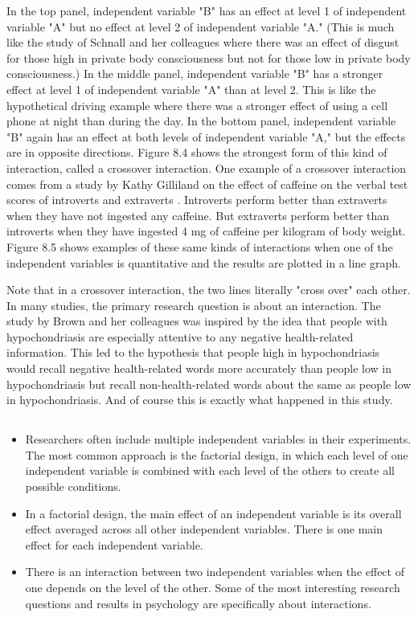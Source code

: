 In the top panel, independent variable "B" has an effect at level 1 of independent variable "A" but no effect at level 2 of independent variable "A." (This is much like the study of Schnall and her colleagues where there was an effect of disgust for those high in private body consciousness but not for those low in private body consciousness.) In the middle panel, independent variable "B" has a stronger effect at level 1 of independent variable "A" than at level 2. This is like the hypothetical driving example where there was a stronger effect of using a cell phone at night than during the day. In the bottom panel, independent variable "B" again has an effect at both levels of independent variable "A," but the effects are in opposite directions. Figure 8.4 shows the strongest form of this kind of interaction, called a crossover interaction. One example of a crossover interaction comes from a study by Kathy Gilliland on the effect of caffeine on the verbal test scores of introverts and extraverts \citep{gilliland_interactive_1980}. Introverts perform better than extraverts when they have not ingested any caffeine. But extraverts perform better than introverts when they have ingested 4 mg of caffeine per kilogram of body weight. Figure 8.5 shows examples of these same kinds of interactions when one of the independent variables is quantitative and the results are plotted in a line graph. 


Note that in a crossover interaction, the two lines literally "cross over" each other. In many studies, the primary research question is about an interaction. The study by Brown and her colleagues was inspired by the idea that people with hypochondriasis are especially attentive to any negative health-related information. This led to the hypothesis that people high in hypochondriasis would recall negative health-related words more accurately than people low in hypochondriasis but recall non-health-related words about the same as people low in hypochondriasis. And of course this is exactly what happened in this study.

\subsection{}

\begin{itemize}

\item Researchers often include multiple independent variables in their experiments. The most common approach is the factorial design, in which each level of one independent variable is combined with each level of the others to create all possible conditions.
\item In a factorial design, the main effect of an independent variable is its overall effect averaged across all other independent variables. There is one main effect for each independent variable.
\item There is an interaction between two independent variables when the effect of one depends on the level of the other. Some of the most interesting research questions and results in psychology are specifically about interactions.


\end{itemize}


